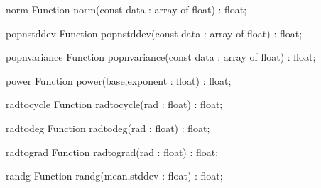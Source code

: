 \FPCexample{}


\begin{function}{norm}
\Declaration
Function norm(const data : array of float) : float;
\Description

\Errors
\SeeAlso
\end{function}

\FPCexample{}


\begin{function}{popnstddev}
\Declaration
Function popnstddev(const data : array of float) : float;
\Description

\Errors
\SeeAlso
\end{function}

\FPCexample{}


\begin{function}{popnvariance}
\Declaration
Function popnvariance(const data : array of float) : float;
\Description

\Errors
\SeeAlso
\end{function}

\FPCexample{}


\begin{function}{power}
\Declaration
Function power(base,exponent : float) : float;
\Description

\Errors
\SeeAlso
\end{function}

\FPCexample{}


\begin{function}{radtocycle}
\Declaration
Function radtocycle(rad : float) : float;
\Description

\Errors
\SeeAlso
\end{function}

\FPCexample{}


\begin{function}{radtodeg}
\Declaration
Function radtodeg(rad : float) : float;
\Description

\Errors
\SeeAlso
\end{function}

\FPCexample{}


\begin{function}{radtograd}
\Declaration
Function radtograd(rad : float) : float;
\Description

\Errors
\SeeAlso
\end{function}

\FPCexample{}


\begin{function}{randg}
\Declaration
Function randg(mean,stddev : float) : float;
\Description

\Errors
\SeeAlso
\end{function}

